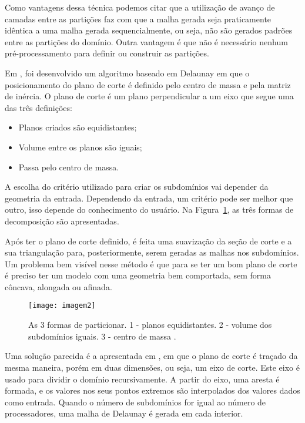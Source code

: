  Como vantagens dessa técnica podemos citar que a utilização de avanço de camadas entre as partições faz com que a malha gerada seja praticamente idêntica a uma malha gerada sequencialmente, ou seja, não são gerados padrões entre as partições do domínio. Outra vantagem é que não é necessário nenhum pré-processamento para definir ou construir as partições.
 
Em \cite{bib:Ivanov06}, foi desenvolvido um algoritmo baseado em Delaunay em que o posicionamento do plano de corte é definido pelo centro de massa e pela matriz de inércia. O plano de corte é um plano perpendicular a um eixo que segue uma das três definições:

\begin{itemize}
  \item Planos criados são equidistantes;

  \item Volume entre os planos são iguais;

  \item Passa pelo centro de massa.
\end{itemize}

A escolha do critério utilizado para criar os subdomínios vai depender da geometria da entrada. Dependendo da entrada, um critério pode ser melhor que outro, isso depende do conhecimento do usuário. Na Figura~\ref{fig:imagem2}, as três formas de decomposição são apresentadas.

Após ter o plano de corte definido, é feita uma suavização da seção de corte e a sua triangulação para, posteriormente, serem geradas as malhas nos subdomínios. Um problema bem visível nesse método é que para se ter um bom plano de corte é preciso ter um modelo com uma geometria bem comportada, sem forma côncava, alongada ou afinada.

 \begin{figure}[htbp]
     \centering
     \texttt{[image: imagem2]}
     \caption{As 3 formas de particionar. 1 - planos equidistantes. 2 - volume dos subdomínios iguais. 3 - centro de massa \cite{bib:Ivanov06}.}
     \label{fig:imagem2}
 \end{figure}

Uma solução parecida é a apresentada em \cite{bib:Lammer00}, em que o plano de corte é traçado da mesma maneira, porém em duas dimensões, ou seja, um eixo de corte. Este eixo é usado para dividir o domínio recursivamente. A partir do eixo, uma aresta é formada, e os valores nos seus pontos extremos são interpolados dos valores dados como entrada. Quando o número de subdomínios for igual ao número de processadores, uma malha de Delaunay é gerada em cada interior.

